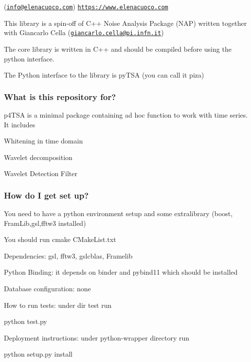 \href{http://p4tsa.readthedocs.io/en/latest/?badge=latest}{\tt } \href{https://travis-ci.org/elenacuoco/p4TSA}{\tt }

(\href{mailto:info@elenacuoco.com}{\tt info@elenacuoco.\+com}) \href{https://www.elenacuoco.com}{\tt https\+://www.\+elenacuoco.\+com}

This library is a \textquotesingle{}spin-\/off\textquotesingle{} of C++ Noise Analysis Package (N\+AP) written together with Giancarlo Cella (\href{mailto:giancarlo.cella@pi.infn.it}{\tt giancarlo.\+cella@pi.\+infn.\+it})

The core library is written in C++ and should be compiled before using the python interface.

The Python interface to the library is py\+T\+SA (you can call it pi\textquotesingle{}za)

\subsubsection*{What is this repository for?}

p4\+T\+SA is a minimal package containing ad hoc function to work with time series. It includes
\begin{DoxyItemize}
\item Whitening in time domain
\item Wavelet decomposition
\item Wavelet Detection Filter
\end{DoxyItemize}

\subsubsection*{How do I get set up?}


\begin{DoxyItemize}
\item You need to have a python environment setup and some extralibrary (boost, Fram\+Lib,gsl,fftw3 installed)
\item You should run cmake C\+Make\+List.\+txt
\item Dependencies\+: gsl, fftw3, gslcblas, Framelib
\item Python Binding\+: it depends on binder and pybind11 which should be installed
\item Database configuration\+: none
\item How to run tests\+: under dir test run

{\ttfamily python test.\+py}
\item Deployment instructions\+: under python-\/wrapper directory run

{\ttfamily python setup.\+py install}
\end{DoxyItemize}

